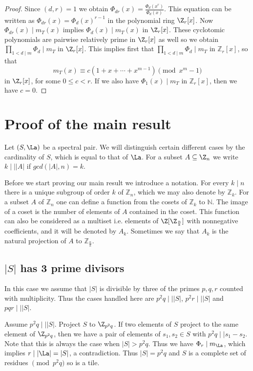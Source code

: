         \begin{proof}
        Since $(d,r)=1$ we obtain $\Phi_{dr}(x)=\frac{\Phi_d(x^r)}{\Phi_d(x)}$. This equation can be written as $\Phi_{dr}(x)=\Phi_d(x)^{r-1}$ in the polynomial ring $\Z_r[x]$. Now $\Phi_{dr}(x) \mid m_T(x)$ implies $\Phi_d(x) \mid m_T(x)$ in $\Z_r[x]$. These cyclotomic polynomials are pairwise
        relatively prime in $\Z_r[x]$ as well so we obtain $\prod_{1 < d \mid m} \Phi_d \mid m_T$ in $\Z_r[x]$. This implies first that 
        $\prod_{1 <d \mid m} \Phi_d \mid m_T$ in $\mathbb{Z}_r[x]$, so that $$ m_T(x) \equiv c \left( 1+x+ \cdots +x^{m-1} \right) \pmod{x^m-1}$$ in $\Z_r[x]$, for some $0 \le c <r$. If we also have $\Phi_1(x) \mid m_T$ in $\mathbb{Z}_r[x]$, then we have $c=0$.
        \end{proof}
        \section{Proof of the main result} 
        Let $(S, \La)$ be a spectral pair. We will distinguish certain different cases by the cardinality of $S$, which is equal to that of $\La$. For a subset $A \subseteq \Z_n$ we write $k \mid \mid |A|$ if $gcd(|A|,n)=k$.
        
        Before we start proving our main result we introduce a notation. 
        For every $k \mid n$ there is a unique subgroup of order $k$ of $\mathbb{Z}_n$, which we may also denote by $\mathbb{Z}_k$. For a subset $A$ of $\mathbb{Z}_n$ one can define a function from the cosets of $\mathbb{Z}_k$ to $\mathbb{N}$. The image of a coset is the number of elements of $A$ contained in the coset. This function can also be considered as a multiset i.e. elements of $\Z[\Z_{\frac{n}{k}}]$ with nonnegative coefficients, and it will be denoted by $A_k$.
        Sometimes we say that $A_k$ is the natural projection of $A$ to $\mathbb{Z}_{\frac{n}{k}}$.
        \subsection{$|S|$ has 3 prime divisors} 
        In this case we assume that $|S|$ is divisible by three of the primes $p,q,r$ counted with multiplicity. 
        Thus the cases handled here are $p^2q \mid \mid |S|$, $p^2r \mid \mid |S|$ and $pqr \mid \mid |S|$. 
        
        Assume  $p^2q\mid\mid |S|$.  Project $S$ to $\Z_{p^2q}$. If two elements of $S$ project to the same element of $\Z_{p^2q}$, then we have a pair of elements of $s_1, s_2 \in S$ with $p^2q \mid \mid s_1-s_2$. 
        Note that this is always the case when $|S|>p^2q$. Thus we have $\Phi_r \mid m_{\La}$, which implies $r \mid |\La|=|S|$, a contradiction.
        Thus $|S|=p^2q$ and $S$ is a complete set of residues $\pmod{p^2q}$ so is a tile. 
        
